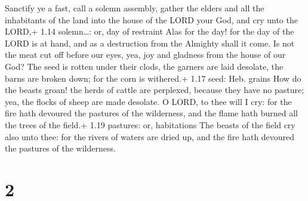  Sanctify ye a fast, call a solemn assembly, gather the
elders and all the inhabitants of the land into the house of the LORD
your God, and cry unto the LORD,+ 1.14 solemn\ldots: or, day of
restraint  Alas for the day! for the day of the LORD is at
hand, and as a destruction from the Almighty shall it come.
 Is not the meat cut off before our eyes, yea, joy and
gladness from the house of our God?  The seed is rotten
under their clods, the garners are laid desolate, the barns are broken
down; for the corn is withered.+ 1.17 seed: Heb. grains 
How do the beasts groan! the herds of cattle are perplexed, because they
have no pasture; yea, the flocks of sheep are made desolate.
 O LORD, to thee will I cry: for the fire hath devoured the
pastures of the wilderness, and the flame hath burned all the trees of
the field.+ 1.19 pastures: or, habitations  The beasts of
the field cry also unto thee: for the rivers of waters are dried up, and
the fire hath devoured the pastures of the wilderness.

\hypertarget{section-1}{%
\section{2}\label{section-1}}

